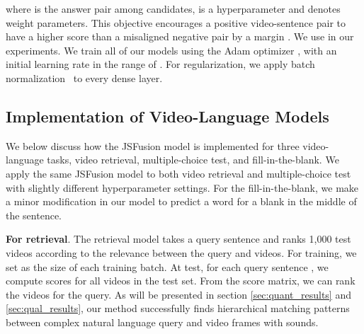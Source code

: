 \documentclass[runningheads]{llncs}
\makeatletter
\DeclareRobustCommand\onedot{\futurelet\@let@token\@onedot}
\def\onedot{.\@\xspace}
\def\ie{\textit{i.e}\onedot} \def\Ie{\textit{I.e}\onedot}
\makeatother
\begin{document}
where  is the answer pair among  candidates,  is a hyperparameter and  denotes weight parameters.
This objective encourages a positive video-sentence pair to have a higher score than a misaligned negative pair by a margin .
We use  in our experiments.
We train all of our models using the Adam optimizer \cite{kingma-iclr-2015}, with an initial learning rate in the range of .
For regularization, we apply batch normalization~\cite{Sergey-icml-2015} to every dense layer. 


\subsection{Implementation of Video-Language Models}
\label{sec:vlmodels}

We below discuss how the JSFusion model is implemented for three video-language tasks, video retrieval, multiple-choice test, and fill-in-the-blank.
We apply the same JSFusion model to both video retrieval and multiple-choice test with slightly different hyperparameter settings. 
For the fill-in-the-blank, we make a minor modification in our model to predict a word for a blank in the middle of the sentence. 

\begin{comment}

For multiple-choice test and movie retrieval tasks, we use similarity matching score between two multimodal sequences. 
For fill-in-the-blank task, we compute matching embedding in every possible (\ie noun, verb) blank positions and predict the correct word. 
For movie description task, we use similarity matching score from retrieval model and retrieve  best plausible sentences. Among retrieved sentences, we select best one based on consensus score.  

For better understanding of our models, we outline the four LSMDC tasks as follows:
(i) \textit{Movie description}: generating a single descriptive sentence for a given movie clip,
(ii) \textit{Fill-in-the-blank}: given a video and a sentence with a single blank, finding a suitable word for the blank from the whole vocabulary set,
(iii) \textit{Multiple-choice test}: given a video query and five descriptive sentences, choosing the correct one out of them, and
(iv) \textit{Movie retrieval}: ranking 1,000 movie clips for a given natural language query.
\end{comment}

\textbf{For retrieval}.
The retrieval model takes a query sentence and ranks 1,000 test videos according to the relevance between the query and videos.
For training, we set  as the size of each training batch. At test, for each query sentence , we compute scores  for all videos  in the test set.
From the score matrix, we can rank the videos for the query.
As will be presented in section \ref{sec:quant_results} and \ref{sec:qual_results}, our method successfully finds hierarchical matching patterns between complex natural language query and video frames with sounds. 
\end{document}
